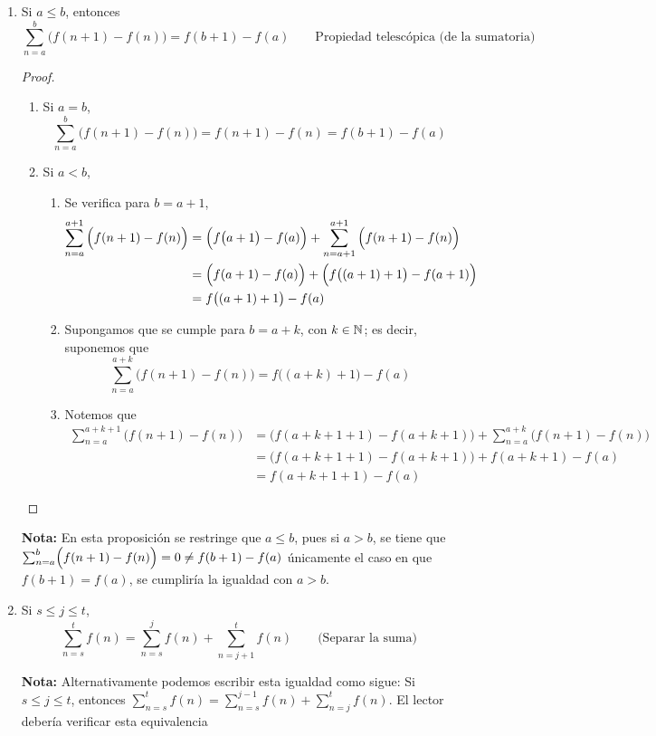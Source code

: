 \begin{enumerate}[label=\alph*)]
  \item Si $a\leq b$, entonces \[\sum_{n=a}^{b} \Big(f(n+1)-f(n)\Big) = f(b+1) - f(a) \qquad \text{Propiedad telescópica (de la sumatoria)}\]
  \begin{proof}\leavevmode
    \begin{enumerate}[label=\Roman*)]
      \item Si $a=b$, \[\sum_{n=a}^{b} \Big(f(n+1)-f(n)\Big) = f(n+1) - f(n) = f(b+1) - f(a)\]
      \item Si $a<b$,
      \begin{enumerate}[label=\roman*)]
        \item Se verifica para $b=a+1$,
        \begin{align*}
          \sum_{n=a}^{a+1} \Big(f(n+1)-f(n)\Big) &= \Bigl(f\big(a+1\big)-f(a)\Bigr) + \sum_{n=a+1}^{a+1} \Big(f(n+1)-f(n)\Big)\\
          &= \Bigl(f(a+1)-f(a)\Bigr) + \Bigl(f\big((a+1)+1\big)-f(a+1)\Bigr)\\
          &= f\bigl((a+1)+1\bigr) - f(a)
        \end{align*}
        \item Supongamos que se cumple para $b=a+k$, con $k\in \mathbb{N}$; es decir, suponemos que
        \[\sum_{n=a}^{a+k} \Big(f(n+1)-f(n)\Big) = f\bigl((a+k)+1\bigr) - f(a)\]
        \item Notemos que
        \begin{align*}
          \sum_{n=a}^{a+k+1} \Big(f(n+1)-f(n)\Big) &= \Big(f(a+k+1+1)-f(a+k+1)\Big) + \sum_{n=a}^{a+k} \Big(f(n+1)-f(n)\Big)\\
          &= \Big(f(a+k+1+1)-f(a+k+1)\Big) + f(a+k+1) - f(a)\\
          &= f(a+k+1+1) - f(a)
        \end{align*}
      \end{enumerate}
    \end{enumerate}
  \end{proof}
  \textbf{Nota:} En esta proposición se restringe que $a\leq b$, pues si $a>b$, se tiene que $\sum_{n=a}^{b} \Bigl(f(n+1)-f(n)\Bigr) = 0 \neq f(b+1) - f(a)$ únicamente el caso en que $f(b+1)=f(a)$, se cumpliría la igualdad con $a>b$.
  
  \item Si $s\leq j\leq t$, \[\sum_{n=s}^{t}f(n) = \sum_{n=s}^{j}f(n) + \sum_{n=j+1}^{t}f(n) \qquad \text{(Separar la suma)}\]
  
  \textbf{Nota:} Alternativamente podemos escribir esta igualdad como sigue: Si $s\leq j\leq t$, entonces $\sum_{n=s}^{t}f(n) = \sum_{n=s}^{j-1}f(n) + \sum_{n=j}^{t}f(n)$. El lector debería verificar esta equivalencia


\end{enumerate}
